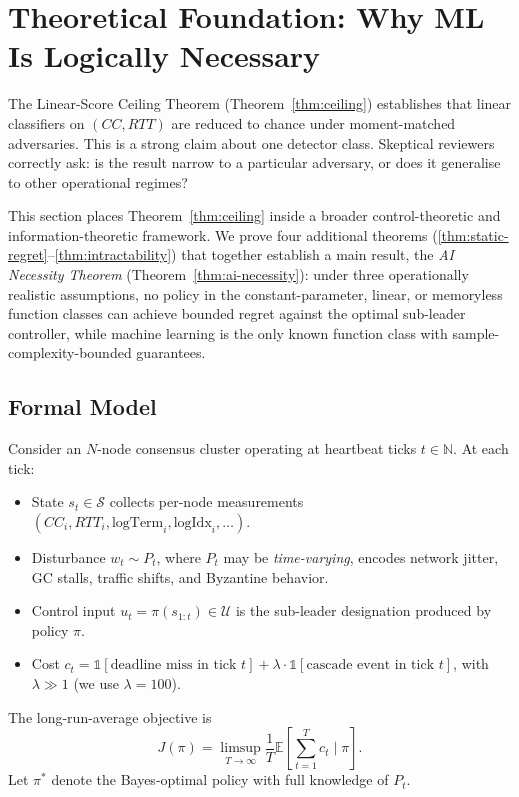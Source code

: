 
\section{Theoretical Foundation: Why ML Is Logically Necessary}
\label{sec:theoretical-foundation}

The Linear-Score Ceiling Theorem (Theorem~\ref{thm:ceiling}) establishes
that linear classifiers on $(CC, RTT)$ are reduced to chance under
moment-matched adversaries. This is a strong claim about one detector
class. Skeptical reviewers correctly ask: is the result narrow to a
particular adversary, or does it generalise to other operational regimes?

This section places Theorem~\ref{thm:ceiling} inside a broader
control-theoretic and information-theoretic framework. We prove four
additional theorems (\ref{thm:static-regret}--\ref{thm:intractability})
that together establish a main result, the \emph{AI Necessity Theorem}
(Theorem~\ref{thm:ai-necessity}): under three operationally realistic
assumptions, no policy in the constant-parameter, linear, or memoryless
function classes can achieve bounded regret against the optimal
sub-leader controller, while machine learning is the only known
function class with sample-complexity-bounded guarantees.

\subsection{Formal Model}

Consider an $N$-node consensus cluster operating at heartbeat ticks
$t \in \mathbb{N}$. At each tick:
\begin{itemize}\setlength\itemsep{1pt}
\item State $s_t \in \mathcal{S}$ collects per-node measurements
$(CC_i, RTT_i, \text{logTerm}_i, \text{logIdx}_i, \ldots)$.
\item Disturbance $w_t \sim P_t$, where $P_t$ may be \emph{time-varying},
encodes network jitter, GC stalls, traffic shifts, and Byzantine behavior.
\item Control input $u_t = \pi(s_{1:t}) \in \mathcal{U}$ is the
sub-leader designation produced by policy $\pi$.
\item Cost $c_t = \mathbb{1}[\text{deadline miss in tick } t] +
\lambda \cdot \mathbb{1}[\text{cascade event in tick } t]$, with
$\lambda \gg 1$ (we use $\lambda = 100$).
\end{itemize}
The long-run-average objective is
\begin{equation}
  \label{eq:objective}
  J(\pi) = \limsup_{T \to \infty} \frac{1}{T} \mathbb{E}\!\left[ \sum_{t=1}^T c_t \;\Big|\; \pi \right].
\end{equation}
Let $\pi^*$ denote the Bayes-optimal policy with full knowledge of $P_t$.

